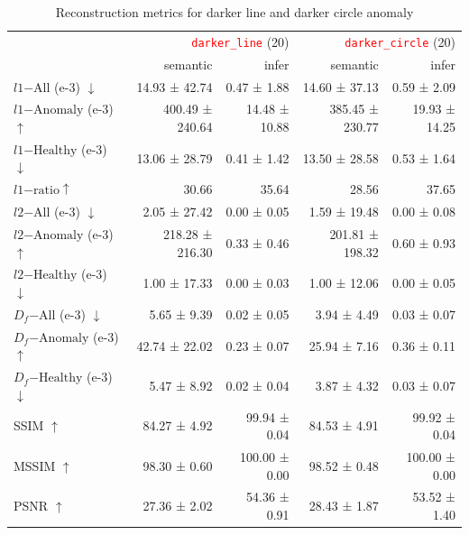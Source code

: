 \begin{table}[htbp]
\vspace{0.5em}

\begin{subtable}{\textwidth}
    \centering
    \begin{adjustbox}{max width=\textwidth}
    \begin{tabular}{lrrrr}
    \toprule
     & \multicolumn{2}{r}{\texttt{\textcolor{red}{darker\_line}} (20)} & \multicolumn{2}{r}{\texttt{\textcolor{red}{darker\_circle}} (20)} \\
     & semantic & infer & semantic & infer \\
    \midrule
    $l1 \mathrm{-All}$ (e-3) $\downarrow$ & 14.93 ± 42.74 & 0.47 ± 1.88 & 14.60 ± 37.13 & 0.59 ± 2.09 \\
    $l1 \mathrm{-Anomaly}$ (e-3) $\uparrow$ & 400.49 ± 240.64 & 14.48 ± 10.88 & 385.45 ± 230.77 & 19.93 ± 14.25 \\
    $l1 \mathrm{-Healthy}$ (e-3) $\downarrow$ & 13.06 ± 28.79 & 0.41 ± 1.42 & 13.50 ± 28.58 & 0.53 ± 1.64 \\
    $l1 \mathrm{-ratio} \uparrow$ & 30.66 & 35.64 & 28.56 & 37.65 \\
    \cline{1-5}
    $l2 \mathrm{-All}$ (e-3) $\downarrow$ & 2.05 ± 27.42 & 0.00 ± 0.05 & 1.59 ± 19.48 & 0.00 ± 0.08 \\
    $l2 \mathrm{-Anomaly}$ (e-3) $\uparrow$ & 218.28 ± 216.30 & 0.33 ± 0.46 & 201.81 ± 198.32 & 0.60 ± 0.93 \\
    $l2 \mathrm{-Healthy}$ (e-3) $\downarrow$ & 1.00 ± 17.33 & 0.00 ± 0.03 & 1.00 ± 12.06 & 0.00 ± 0.05 \\
    \cline{1-5}
    $D_{f} \mathrm{-All}$ (e-3) $\downarrow$ & 5.65 ± 9.39 & 0.02 ± 0.05 & 3.94 ± 4.49 & 0.03 ± 0.07 \\
    $D_{f} \mathrm{-Anomaly}$ (e-3) $\uparrow$ & 42.74 ± 22.02 & 0.23 ± 0.07 & 25.94 ± 7.16 & 0.36 ± 0.11 \\
    $D_{f} \mathrm{-Healthy}$ (e-3) $\downarrow$ & 5.47 ± 8.92 & 0.02 ± 0.04 & 3.87 ± 4.32 & 0.03 ± 0.07 \\
    \cline{1-5}
    SSIM $\uparrow$ & 84.27 ± 4.92 & 99.94 ± 0.04 & 84.53 ± 4.91 & 99.92 ± 0.04 \\
    MSSIM $\uparrow$ & 98.30 ± 0.60 & 100.00 ± 0.00 & 98.52 ± 0.48 & 100.00 ± 0.00 \\
    PSNR $\uparrow$ & 27.36 ± 2.02 & 54.36 ± 0.91 & 28.43 ± 1.87 & 53.52 ± 1.40 \\
    \bottomrule
    \end{tabular}
    \end{adjustbox}
\label{tab:error-starmen-b}
\caption{Reconstruction metrics for darker line and darker circle anomaly}
\end{subtable}
\end{table}

